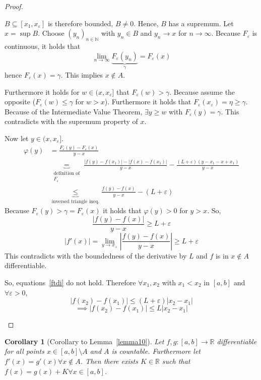 \documentclass{article}
\newtheorem*{corollary}{Corollary}%
\newcommand{\card}[1]{\left|#1\right|}
\begin{document}
\begin{proof}
\begin{enumerate}
      $B \subseteq [x_1, x_{\varepsilon}]$ is therefore bounded, $B \neq 0$.
      Hence, $B$ has a supremum. Let $x = \sup{B}$.
      Choose $(y_n)_{n \in \mathbb N}$ with $y_n \in B$ and $y_n \to x$ for $n \to \infty$.
      Because $F_{\varepsilon}$ is continuous, it holds that
      \[ \lim_{n\to\infty} \underbrace{F_{\varepsilon}(y_n)}_{\gamma} = F_{\varepsilon}(x) \]
      hence $F_{\varepsilon}(x) = \gamma$. This implies $x \not\in A$.

      Furthermore it holds for $w \in (x, x_\varepsilon]$ that $F_{\varepsilon}(w) > \gamma$.
      Because assume the opposite ($F_{\varepsilon}(w) \leq \gamma$ for $w > x$).
      Furthermore it holds that $F_{\varepsilon}(x_{\varepsilon}) = \eta \geq \gamma$.
      Because of the Intermediate Value Theorem, $\exists y \geq w$ with $F_{\varepsilon}(y) = \gamma$.
      This contradicts with the supremum property of $x$.

      Now let $y \in (x, x_{\varepsilon}]$.
      \begin{align*}
        \varphi(y) &= \frac{F_{\varepsilon}(y) - F_{\varepsilon}(x)}{y - x} \\
          &\underbrace{=}_{\substack{\text{definition of} \\ F_{\varepsilon}}}
          \frac{\card{f(y) - f(x_1)} - \card{f(x) - f(x_1)}}{y - x} - \frac{(L + \varepsilon)(y - x_1 - x + x_1)}{y - x} \\
          &\underbrace{\leq}_{\text{inversed triangle ineq.}} \frac{f(y) - f(x)}{y - x} - (L + \varepsilon)
      \end{align*}
      Because $F_{\varepsilon}(y) > \gamma = F_{\varepsilon}(x)$ it holds that $\varphi(y) > 0$ for $y > x$.
      So,
      \[ \frac{\card{f(y) - f(x)}}{y - x} \geq L + \varepsilon \]
      \[ \card{f'(x)} = \lim_{y \to x_+} \card{\frac{f(y) - f(x)}{y - x}} \geq L + \varepsilon \]
      This contradicts with the boundedness of the derivative by $L$ and $f$ is in $x \not\in A$ differentiable.

      So, equations~\ref{ftdi} do not hold. Therefore $\forall x_1, x_2$ with $x_1 < x_2$ in $[a,b]$ and $\forall \varepsilon > 0$,
      \[ \card{f(x_2) - f(x_1)} \leq (L + \varepsilon)\card{x_2 - x_1} \]
      \[ \implies \card{f(x_2) - f(x_1)} \leq L \card{x_2 - x_1} \]
  \end{enumerate}
\end{proof}

\begin{corollary}[Corollary to Lemma~\ref{lemma10}]
  Let $f, g: [a,b] \to \mathbb R$ differentiable for all points $x \in [a,b] \setminus A$
  and $A$ is countable. Furthermore let $f'(x) = g'(x) \forall x \not\in A$.
  Then there exists $K \in \mathbb R$ such that $f(x) = g(x) + K \forall x \in [a,b]$.
\end{corollary}
\end{document}
